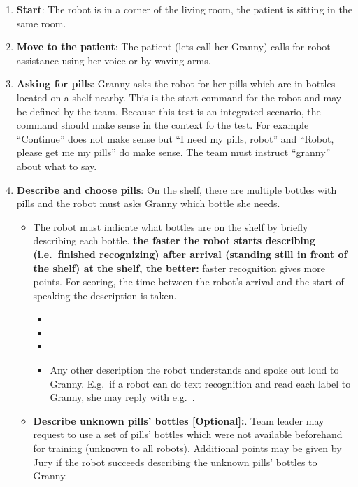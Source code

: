 \begin{enumerate}
	\item \textbf{Start}: The robot is in a corner of the living room, the patient is sitting in the same room. 

	\item \textbf{Move to the patient}: The patient (lets call her Granny) calls for robot assistance using her voice or by waving arms.

	\item \textbf{Asking for pills}: Granny asks the robot for her pills which are in bottles located on a shelf nearby. 
	  This is the start command for the robot and may be defined by the team. 
	  Because this test is an integrated scenario, the command should make sense in the context fo the test.
	  For example ``Continue'' does not make sense but ``I need my pills, robot'' and ``Robot, please get me my pills'' do make sense.
	  The team must instruct ``granny'' about what to say.

	\item \textbf{Describe and choose pills}: On the shelf, there are multiple bottles with pills and the robot must asks Granny which bottle she needs.
	\begin{itemize}
		\item The robot must indicate what bottles are on the shelf by briefly describing each bottle.
		\textbf{the faster the robot starts describing (i.e.~finished recognizing) after arrival (standing still in front of the shelf) at the shelf, the better:} faster recognition gives more points. 
		  For scoring, the time between the robot's arrival and the start of speaking the description is taken.
		\begin{itemize}
 			\item {}
  			\item {}
  			\item {}
  			\item Any other description the robot understands and spoke out loud to Granny. E.g.~if a robot can do text recognition and read each label to Granny, she may reply with e.g.~.
 		\end{itemize}
		\item \textbf{Describe unknown pills' bottles [Optional]:}. Team leader may request to use a set of pills' bottles which were not available beforehand for training (unknown to all robots). Additional points may be given by Jury if the robot succeeds describing the unknown pills' bottles to Granny.
 	\end{itemize}


\end{enumerate}
